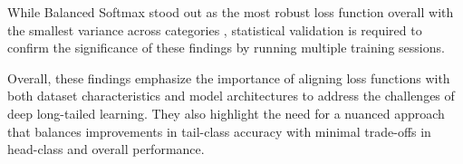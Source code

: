 While Balanced Softmax stood out as the most robust loss function overall with the smallest variance across categories , statistical validation is required to confirm the significance of these findings by running multiple training sessions.

Overall, these findings emphasize the importance of aligning loss functions with both dataset characteristics and model architectures to address the challenges of deep long-tailed learning. They also highlight the need for a nuanced approach that balances improvements in tail-class accuracy with minimal trade-offs in head-class and overall performance.

